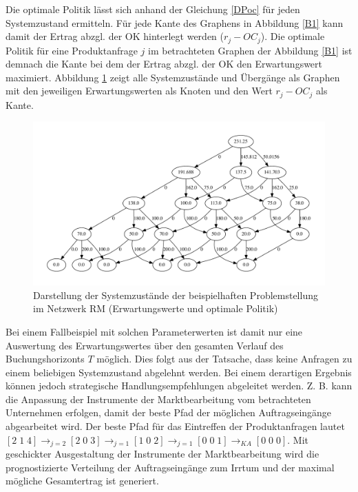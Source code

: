 Die optimale Politik lässt sich anhand der Gleichung \eqref{DPoc} für jeden Systemzustand ermitteln. Für jede Kante des Graphens in Abbildung \ref{B1} kann damit der Ertrag abzgl. der OK hinterlegt werden ($r_{j}-OC_{j}$). Die optimale Politik für eine Produktanfrage $j$ im betrachteten Graphen der Abbildung \ref{B1} ist demnach die Kante bei dem der Ertrag abzgl. der OK den Erwartungswert maximiert. Abbildung \ref{B1a} zeigt alle Systemzustände und Übergänge als Graphen mit den jeweiligen Erwartungswerten als Knoten und den Wert $r_{j}-OC_{j}$ als Kante.
\begin{figure}[h!]
  \begin{center}
    \includegraphics[width=150mm]{Bilder/Beispiel1a.pdf}
    \caption{Darstellung der Systemzustände der beispielhaften Problemstellung im Netzwerk RM (Erwartungswerte und optimale Politik)}  \label{B1a}
  \end{center}
\end{figure}

Bei einem Fallbeispiel mit solchen Parameterwerten ist damit nur eine Auswertung des Erwartungswertes über den gesamten Verlauf des Buchungshorizonts $T$ möglich. Dies folgt aus der Tatsache, dass keine Anfragen zu einem beliebigen Systemzustand abgelehnt werden. Bei einem derartigen Ergebnis können jedoch strategische Handlungsempfehlungen abgeleitet werden. Z. B. kann die Anpassung der Instrumente der Marktbearbeitung vom betrachteten Unternehmen erfolgen, damit der beste Pfad der möglichen Auftragseingänge abgearbeitet wird. Der beste Pfad für das Eintreffen der Produktanfragen lautet $[2\;1\;4] \rightarrow_{j={2}}[2\;0\;3] \rightarrow_{j={1}}[1\;0\;2]\rightarrow_{j={1}}[0\;0\;1]\rightarrow_{KA}[0\;0\;0]$. Mit geschickter Ausgestaltung der Instrumente der Marktbearbeitung wird die prognostizierte Verteilung der Auftragseingänge zum Irrtum und der maximal mögliche Gesamtertrag ist generiert.

